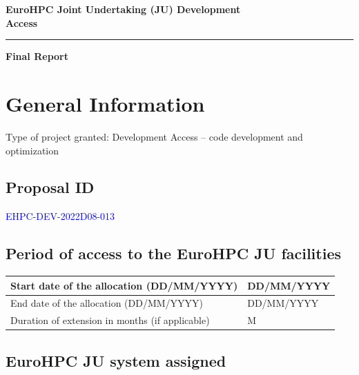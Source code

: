 \documentclass[a4paper,12pt]{article}
\newif\ifshowinstructions
\newcommand{\instructions}[1]{\ifshowinstructions {\fontsize{10}{11}\selectfont \textit{#1}} \fi}
\newcommand{\checkbox}[1]{%
  \ifthenelse{\equal{#1}{yes}}{$\boxtimes$}{$\Box$}%
}
\begin{document}
{\fontsize{20}{32} \selectfont\textbf{EuroHPC Joint Undertaking (JU) Development \\Access}}
{\color{orng}\hrule height 1pt}
{\fontsize{20}{32} \selectfont\textbf{Final Report}}

\section{General Information}

Type of project granted: Development Access -- code development and optimization

\subsection{Proposal ID}

\instructions{Please fill in the information in the box below.}

\begin{mdframed}
  \textcolor{blue}{EHPC-DEV-2022D08-013}
\end{mdframed}

\subsection{Period of access to the EuroHPC JU facilities}

\instructions{Please fill in the information in the box below.}

\begin{tabulary}{\textwidth}{|p{0.47\textwidth}|p{0.47\textwidth}|}
  \hline
  Start date of the allocation (DD/MM/YYYY) & DD/MM/YYYY \\
  \hline
  End date of the allocation (DD/MM/YYYY) & DD/MM/YYYY \\
  \hline
  Duration of extension in months (if applicable) & M \\
  \hline
\end{tabulary}

\subsection{EuroHPC JU system assigned}

\instructions{Plese click once in the box to select it, click again to unselect.}

\end{document}
